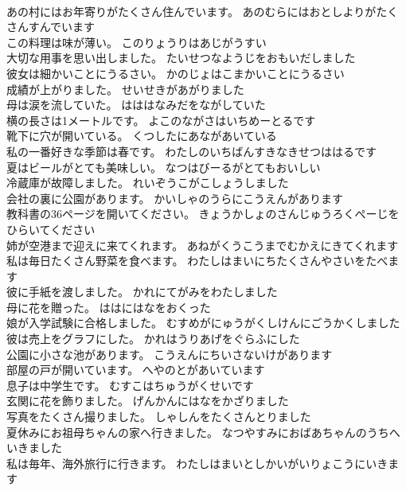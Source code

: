 \documentclass[8pt]{extreport}
\begin{document}
\begin{CJK}{UTF8}{min}
\\	あの村にはお年寄りがたくさん住んでいます。	あのむらにはおとしよりがたくさんすんでいます 
\\	この料理は味が薄い。	このりょうりはあじがうすい 
\\	大切な用事を思い出しました。	たいせつなようじをおもいだしました 
\\	彼女は細かいことにうるさい。	かのじょはこまかいことにうるさい 
\\	成績が上がりました。	せいせきがあがりました 
\\	母は涙を流していた。	はははなみだをながしていた 
\\	横の長さは1メートルです。	よこのながさはいちめーとるです 
\\	靴下に穴が開いている。	くつしたにあながあいている 
\\	私の一番好きな季節は春です。	わたしのいちばんすきなきせつははるです 
\\	夏はビールがとても美味しい。	なつはびーるがとてもおいしい 
\\	冷蔵庫が故障しました。	れいぞうこがこしょうしました 
\\	会社の裏に公園があります。	かいしゃのうらにこうえんがあります 
\\	教科書の36ページを開いてください。	きょうかしょのさんじゅうろくぺーじをひらいてください 
\\	姉が空港まで迎えに来てくれます。	あねがくうこうまでむかえにきてくれます 
\\	私は毎日たくさん野菜を食べます。	わたしはまいにちたくさんやさいをたべます 
\\	彼に手紙を渡しました。	かれにてがみをわたしました 
\\	母に花を贈った。	ははにはなをおくった 
\\	娘が入学試験に合格しました。	むすめがにゅうがくしけんにごうかくしました 
\\	彼は売上をグラフにした。	かれはうりあげをぐらふにした 
\\	公園に小さな池があります。	こうえんにちいさないけがあります 
\\	部屋の戸が開いています。	へやのとがあいています 
\\	息子は中学生です。	むすこはちゅうがくせいです 
\\	玄関に花を飾りました。	げんかんにはなをかざりました 
\\	写真をたくさん撮りました。	しゃしんをたくさんとりました 
\\	夏休みにお祖母ちゃんの家へ行きました。	なつやすみにおばあちゃんのうちへいきました 
\\	私は毎年、海外旅行に行きます。	わたしはまいとしかいがいりょこうにいきます 

\end{CJK}
\end{document}
